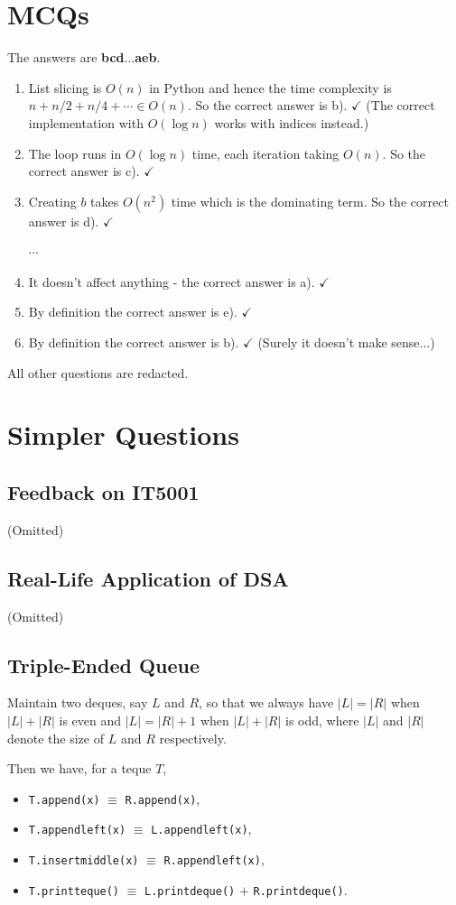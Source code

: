 \documentclass[12pt]{article}
\renewcommand{\t}{\texttt}
\begin{document}
\section{MCQs}
The answers are \textbf{bcd}...\textbf{aeb}.
\begin{enumerate}
\item List slicing is $O(n)$ in Python and hence the time complexity is $n+n/2+n/4+\cdots\in O(n)$. So the correct answer is b). $\checkmark$ (The correct implementation with $O(\log n)$ works with indices instead.)
\item The loop runs in $O(\log n)$ time, each iteration taking $O(n)$. So the correct answer is c). $\checkmark$
\item Creating $b$ takes $O\left(n^2\right)$ time which is the dominating term. So the correct answer is d). $\checkmark$

$\cdots$
\setcounter{enumi}{22}
\item It doesn't affect anything - the correct answer is a). $\checkmark$
\item By definition the correct answer is e). $\checkmark$
\item By definition the correct answer is b). $\checkmark$ (Surely it doesn't make sense...)
\end{enumerate}
All other questions are redacted.
\section{Simpler Questions}
\subsection{Feedback on IT5001}
(Omitted)
\subsection{Real-Life Application of DSA}
(Omitted)
\subsection{Triple-Ended Queue}
Maintain two deques, say $L$ and $R$, so that we always have $|L|=|R|$ when $|L|+|R|$ is even and $|L|=|R|+1$ when $|L|+|R|$ is odd, where $|L|$ and $|R|$ denote the size of $L$ and $R$ respectively.

Then we have, for a teque $T$,
\begin{itemize}
\item \t{T.append(x)} $\equiv$ \t{R.append(x)},
\item \t{T.appendleft(x)} $\equiv$ \t{L.appendleft(x)},
\item \t{T.insertmiddle(x)} $\equiv$ \t{R.appendleft(x)},
\item \t{T.printteque()} $\equiv$ \t{L.printdeque()} $+$ \t{R.printdeque()}.
\end{itemize}
\end{document}
